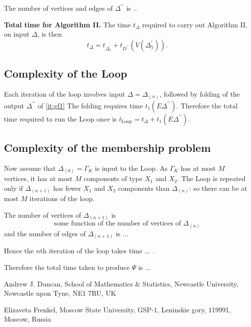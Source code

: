 \documentclass[a4paper,12pt]{article}
\newcommand{\G}{\Gamma }
\newcommand{\D}{\Delta }
\numberwithin{equation}{section}
\numberwithin{figure}{section}
\newcommand{\Loop}{\operatorname{Loop}}
\begin{document}
The number of vertices and edges of $\D^{\prime\prime}$ is ..

{\bf Total time for Algorithm II.}
The time $t_{\D}$ required to carry out   Algorithm II, on input $\D$, is then
 \begin{equation}\label{eq:alg2}
t_{\D}=t_{\D^\prime_5}+t_{D^{\prime\prime}}(V(\D^\prime_5)).
\end{equation}



\subsection{Complexity of the Loop}\label{sub:loop}
Each iteration of the loop involves input $\D=\D_{(n)}$, followed by
folding of the output $\D^{\prime\prime}$ of \ref{it:gf1}
The folding requires time $t_1(E\D^{\prime\prime})$. Therefore the
total time required to run the Loop once is
 $t_{\Loop}= t_{\D}+t_1(E\D^{\prime\prime})$.


\subsection{Complexity of the membership problem}\label{sub:mp_complexity}

Now assume that $\D_{(0)}=\G_K$ is input to the Loop. As $\G_K$ has at
most $M$ vertices, it has at most $M$  components of type $X_1$ and $X_2$.
 The Loop  is repeated
 only if $\D_{(n+1)}$ has fewer  $X_1$ and $X_2$ components
than $\D_{(n)}$: so there can be at most $M$ iterations of the loop.

The number of vertices of $\D_{(n+1)}$ is
\[\textrm{some function of the number of vertices of } \D_{(n)}\]
and the number of edges of     $\D_{(n+1)}$ is ...

Hence the $n$th iteration of the loop takes time ... .

Therefore the total time taken to produce $\Psi$ is ...





\medskip



\noindent \textsf{Andrew J. Duncan, School of Mathematics \&
Statistics, Newcastle University, Newcastle upon Tyne, NE1 7RU,
UK}



\noindent \textsf{Elizaveta Frenkel, Moscow State University,
GSP-1, Leninskie gory, 119991, Moscow, Russia}

\end{document}
